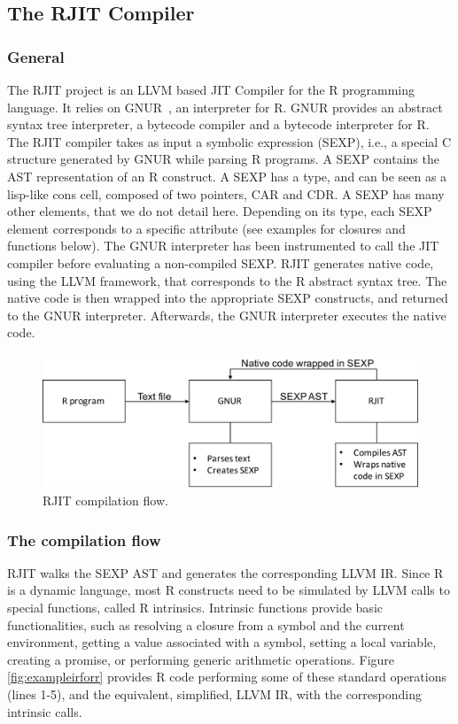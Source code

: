 \subsection{The RJIT Compiler}
\subsubsection{General}

The RJIT project is an LLVM based JIT Compiler for the R programming language.
It relies on GNUR~\cite{RURL}, an interpreter for R. 
GNUR provides an abstract syntax tree interpreter, a bytecode compiler and a bytecode interpreter for R.
The RJIT compiler takes as input a symbolic expression (SEXP), i.e., a special C structure generated by GNUR while parsing R programs.
A SEXP contains the AST representation of an R construct.
A SEXP has a type, and can be seen as a lisp-like cons cell, composed of two pointers, CAR and CDR.
A SEXP has many other elements, that we do not detail here.
Depending on its type, each SEXP element corresponds to a specific attribute (see examples for closures and functions below). 
The GNUR interpreter has been instrumented to call the JIT compiler before evaluating a non-compiled SEXP. 
RJIT generates native code, using the LLVM framework, that corresponds to the R abstract syntax tree.
The native code is then wrapped into the appropriate SEXP constructs, and returned to the GNUR interpreter.
Afterwards, the GNUR interpreter executes the native code.\\ 

\begin{figure}[h]
    \includegraphics[scale=0.5]{Figures/RJITFlow}
    \caption{RJIT compilation flow.}
\end{figure}

\subsubsection{The compilation flow}
RJIT walks the SEXP AST and generates the corresponding LLVM IR.
Since R is a dynamic language, most R constructs need to be simulated by LLVM calls to special functions, called R intrinsics.
Intrinsic functions provide basic functionalities, such as resolving a closure from a symbol and the current environment, getting a value associated with a symbol, setting a local variable, creating a promise, or performing generic arithmetic operations.
Figure \ref{fig:exampleirforr} provides R code performing some of these standard operations (lines 1-5), and the equivalent, simplified, LLVM IR, with the corresponding intrinsic calls.\\

